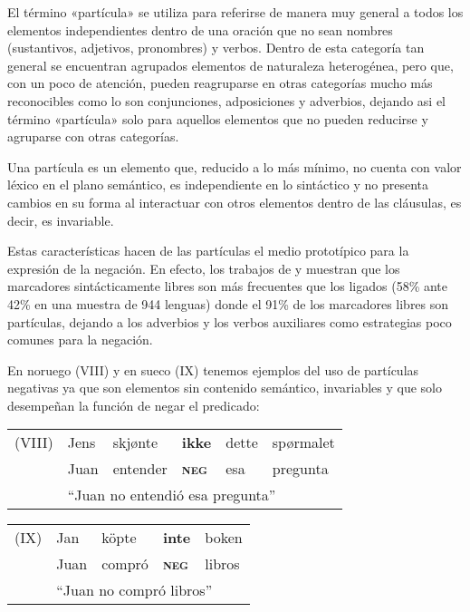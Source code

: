 \noindent El término «partícula» se utiliza para referirse de manera muy general a todos los elementos independientes dentro de una oración que no sean nombres (sustantivos, adjetivos, pronombres) y verbos. Dentro de esta categoría tan general se encuentran agrupados elementos de naturaleza heterogénea, pero que, con un poco de atención, pueden reagruparse en otras categorías mucho más reconocibles como lo son conjunciones, adposiciones y adverbios, dejando asi el término «partícula» solo para aquellos elementos que no pueden reducirse y agruparse con otras categorías.

Una partícula  es un elemento que, reducido a lo más mínimo, no cuenta con valor léxico en el plano semántico, es independiente en lo sintáctico y no presenta cambios en su forma al interactuar con otros elementos dentro de las cláusulas, es decir, es invariable.

Estas características hacen de las partículas el medio prototípico para la expresión de la negación. En efecto, los trabajos de \textcolor{MidnightBlue}{\citet{morfemas}} y \textcolor{MidnightBlue}{\citet{Vossen2016}} muestran que los marcadores sintácticamente libres son más frecuentes que los ligados (58\% ante 42\% en una muestra de 944 lenguas) donde el 91\% de los marcadores libres son partículas, dejando a los adverbios y los verbos auxiliares como estrategias poco comunes para la negación.

En noruego (VIII) y en sueco (IX) tenemos ejemplos del uso de partículas negativas ya que son elementos sin contenido semántico, invariables y que solo desempeñan la función de negar el predicado: \vspace{0.5cm}

{\setmainfont{Charis SIL} 

\begin{tabular}{llllll}
(VIII) & Jens & skjønte & \textbf{ikke} & dette & spørmalet \\
& Juan & entender & \textsc{\textbf{neg}} & esa & pregunta \\
& \multicolumn{5}{l}{``Juan no entendió esa pregunta'' \qquad \textcolor{MidnightBlue}{\citep[pág. 7]{Taraldsen1985}}}
\end{tabular} \vspace{0.5cm}

\begin{tabular}{lllll}
(IX) & Jan & köpte & \textbf{inte} & boken \\
& Juan & compró & \textsc{\textbf{neg}} & libros \\
& \multicolumn{4}{l}{``Juan no compró libros'' \qquad \textcolor{MidnightBlue}{\citep[pág. 45]{Holmberg1995}}}
\end{tabular} \vspace{0.5cm}


} %


